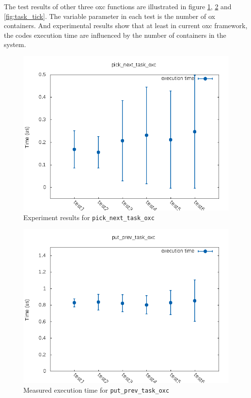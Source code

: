 The test results of other three oxc functions are illustrated in figure 
\ref{fig:pick_next}, \ref{fig:put_prev} and \ref{fig:task_tick}.
The variable parameter in each test is the number of ox containers.
And experimental results show that at least in current oxc framework, the
codes execution time are influenced by the number of containers in the
system.
\begin{figure}[htbp]
        \centering
        \includegraphics[width=\textwidth]{images/pick_next_task_oxc}
        \caption{Experiment results for \texttt{pick\_next\_task\_oxc}}
        \label{fig:pick_next}
\end{figure}
\begin{figure}[htbp]
        \centering
        \includegraphics[width=\textwidth]{images/put_prev_task_oxc}
        \caption{Measured execution time for \texttt{put\_prev\_task\_oxc}}
        \label{fig:put_prev}
\end{figure}
